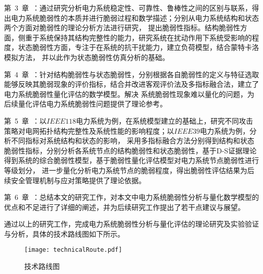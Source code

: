 第~3~章~：通过研究分析电力系统稳定性、可靠性、鲁棒性之间的区别与联系，得出电力系统脆弱性的本质并进行脆弱过程和数学描述；分别从电力系统结构和状态两个方面对脆弱性的理论分析方法进行研究，
提出脆弱性指标。结构脆弱性方面，侧重于系统保持其结构完整性的能力，研究系统在扰动作用下系统受影响的程度，状态脆弱性方面，专注于在系统的抗干扰能力，建立负荷模型，结合蒙特卡洛模拟方法，
并以此作为状态脆弱性仿真分析的基础。

第~4~章~：针对结构脆弱性与状态脆弱性，分别根据各自脆弱性的定义与特征选取能够反映其脆弱现象的评价指标，结合并改进客观评价法及多指标融合法，建立了电力系统脆弱性量化评估的数学模型。解决
系统脆弱性现象难以量化的问题，为后续量化评估电力系统脆弱性问题提供了理论参考。

第~5~章~：以$IEEE118$电力系统为例，在系统模型建立的基础上，研究不同攻击策略对电网拓扑结构完整性及系统性能的影响程度；以$IEEE39$电力系统为例，分析不同指标对系统结构和状态的影响，
采用多指标融合方法分别得到结构和状态脆弱性指标，分别分析各系统节点的结构脆弱性和状态脆弱性，基于D-S证据理论得到系统的综合脆弱性模型，基于脆弱性量化评估模型对电力系统节点脆弱性进行等级划分，
进一步量化分析电力系统节点的脆弱程度，得出脆弱性评估结果为后续安全管理机制与应对策略提供了理论依据。

第~6~章~：总结本文的研究工作，对本文中电力系统脆弱性分析与量化数学模型的优点和不足进行了详细的阐述，并为后续研究工作提出了若干点建议与展望。

通过以上的研究工作，完成电力系统脆弱性分析与量化评估的理论研究及实验验证与分析，具体的技术路线图如下所示。
\begin{figure}[H] %
  \centering
  \texttt{[image: technicalRoute.pdf]}
  \caption{技术路线图}
  \label{fig:technicalRoute}
\end{figure}
